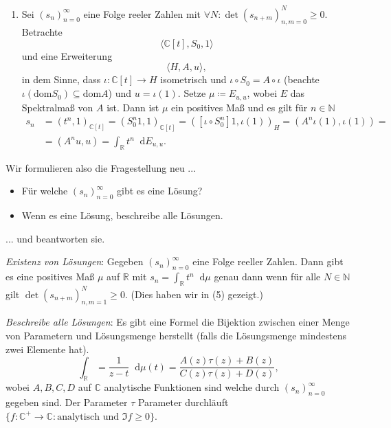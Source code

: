 \documentclass[letterpaper, 11pt]{article}
\newcommand{\R}{\mathbb{R}}
\newcommand{\C}{\mathbb{C}}
\newcommand{\N}{\mathbb{N}}
\newcommand{\1}{\mathds{1}}
\newcommand{\diff}{\mathop{}\!\mathrm{d}}
\theoremstyle{definition}
\begin{document}
\begin{enumerate}
  \item Sei $(s_n)_{n=0}^\infty$ eine Folge reeler Zahlen mit $\forall N : \det (s_{n+m})_{n,m=0}^N \geq 0$. Betrachte
  $$ \langle \C[t], S_0, 1 \rangle $$
  und eine Erweiterung
  $$ \langle H, A, u \rangle, $$
  in dem Sinne, dass $\iota : \C[t] \to H$ isometrisch und $\iota \circ S_0 = A \circ \iota$ (beachte $\iota(\mathrm{dom} S_0) \subseteq \mathrm{dom} A$) und $u = \iota(1)$. Setze $\mu \coloneqq E_{u, u}$, wobei $E$ das Spektralmaß von $A$ ist. Dann ist $\mu$ ein positives Maß und es gilt für $n \in \N$
  \begin{align*}
    s_n &= (t^n, 1)_{\C[t]} = (S_0^n 1, 1)_{\C[t]} = ([\iota \circ S_0^n] 1, \iota(1))_H = (A^n \iota(1), \iota(1)) = \\
    &= (A^n u, u) = \int_\R t^n \diff E_{u, u}.
  \end{align*}
\end{enumerate}

Wir formulieren also die Fragestellung neu ...
\begin{itemize}
  \item Für welche $(s_n)_{n=0}^\infty$ gibt es eine Lösung?
  \item Wenn es eine Lösung, beschreibe alle Lösungen.
\end{itemize}
... und beantworten sie.

\emph{Existenz von Lösungen}: Gegeben $(s_n)_{n=0}^\infty$ eine Folge reeller Zahlen. Dann gibt es eine positives Maß $\mu$ auf $\R$ mit $s_n = \int_\R t^n \diff \mu$ genau dann wenn für alle $N \in \N$ gilt $\det (s_{n+m})_{n,m=1}^N \geq 0$. (Dies haben wir in (5) gezeigt.)

\emph{Beschreibe alle Lösungen}: Es gibt eine Formel die Bijektion zwischen einer Menge von Parametern und Lösungsmenge herstellt (falls die Lösungsmenge mindestens zwei Elemente hat).
$$ \int_\R = \frac{1}{z - t} \diff \mu(t) = \frac{A(z) \tau(z) + B(z)}{C(z) \tau(z) + D(z)}, $$
wobei $A, B, C, D$ auf $\C$ analytische Funktionen sind welche durch $(s_n)_{n=0}^\infty$ gegeben sind. Der Parameter $\tau$ Parameter durchläuft $\{ f : \C^+ \to \C : \textrm{analytisch und } \Im f \geq 0 \}$.
\end{document}
